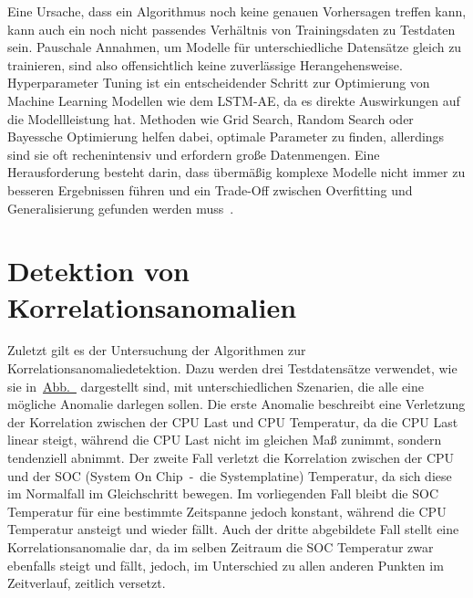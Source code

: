 Eine Ursache, dass ein Algorithmus noch keine genauen Vorhersagen treffen kann, kann auch ein noch nicht passendes Verhältnis von Trainingsdaten zu
Testdaten sein. Pauschale Annahmen, um Modelle für unterschiedliche Datensätze gleich zu trainieren, sind also offensichtlich keine zuverlässige
Herangehensweise. Hyperparameter Tuning ist ein entscheidender Schritt zur Optimierung von Machine Learning Modellen wie dem LSTM-AE, da es direkte
Auswirkungen auf die Modellleistung hat. Methoden wie Grid Search, Random Search oder Bayessche Optimierung helfen dabei, optimale Parameter zu finden,
allerdings sind sie oft rechenintensiv und erfordern große Datenmengen. Eine Herausforderung besteht darin, dass übermäßig komplexe Modelle nicht immer
zu besseren Ergebnissen führen und ein Trade-Off zwischen Overfitting und Generalisierung gefunden werden muss~\cite{Iravani2022}.

\section{Detektion von Korrelationsanomalien}

Zuletzt gilt es der Untersuchung der Algorithmen zur Korrelationsanomaliedetektion. Dazu werden drei Testdatensätze verwendet, wie sie
in~\hyperref[fig:korrelationsanomalie_datensätze]{Abb.~} dargestellt sind, mit unterschiedlichen
Szenarien, die alle eine mögliche Anomalie darlegen sollen. Die erste Anomalie beschreibt eine Verletzung der Korrelation zwischen der
CPU Last und CPU Temperatur, da die CPU Last linear steigt, während die CPU Last nicht im gleichen Maß zunimmt, sondern tendenziell abnimmt.
Der zweite Fall verletzt die Korrelation zwischen der CPU und der SOC (System On Chip~-~die Systemplatine) Temperatur, da sich diese im
Normalfall im Gleichschritt bewegen. Im vorliegenden Fall bleibt die SOC Temperatur für eine bestimmte Zeitspanne jedoch konstant, während die
CPU Temperatur ansteigt und wieder fällt. Auch der dritte abgebildete Fall stellt eine Korrelationsanomalie dar, da im selben Zeitraum die
SOC Temperatur zwar ebenfalls steigt und fällt, jedoch, im Unterschied zu allen anderen Punkten im Zeitverlauf, zeitlich versetzt.

